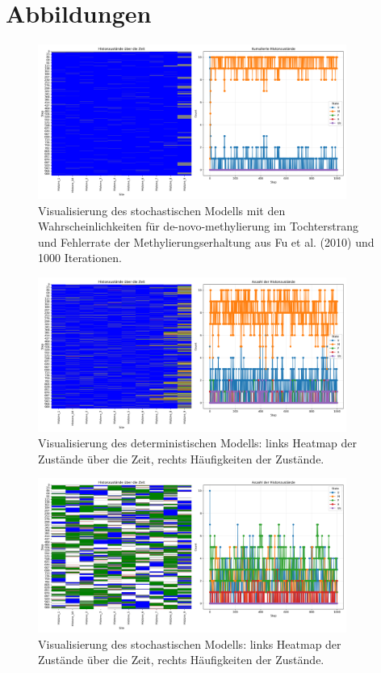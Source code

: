 \documentclass{SeminarV2}
\begin{document}
\section{Abbildungen}


\begin{figure}[htbp]
  \centering
  \includegraphics[width=0.9\textwidth]{images/Histone_Fu_1000.png}
  \caption{Visualisierung des stochastischen Modells mit den Wahrscheinlichkeiten für de-novo-methylierung im Tochterstrang und Fehlerrate der Methylierungserhaltung aus Fu et al. (2010) und 1000 Iterationen. \cite{fu-2010}}
  \label{fig:Fu_1000}
\end{figure}

\begin{figure}[htbp]
\centering
\includegraphics[width=0.9\textwidth]{images/Histone_Prohaska_1000.png}
\caption{Visualisierung des deterministischen Modells: links Heatmap der Zustände über die Zeit, rechts Häufigkeiten der Zustände.}
\label{fig:P_1000}
\end{figure}

\begin{figure}[htbp]
\centering
\includegraphics[width=0.9\textwidth]{images/Histone_Markov_1000.png}
\caption{Visualisierung des stochastischen Modells: links Heatmap der Zustände über die Zeit, rechts Häufigkeiten der Zustände.}
\label{fig:M_1000}
\end{figure}
\end{document}
